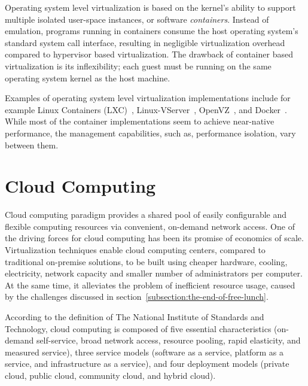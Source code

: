 Operating system level virtualization is based on the kernel's ability to support multiple isolated user-space instances, or software \emph{containers}. Instead of emulation, programs running in containers consume the host operating system's standard system call interface, resulting in negligible virtualization overhead compared to hypervisor based virtualization. The drawback of container based virtualization is its inflexibility; each guest must be running on the same operating system kernel as the host machine.~\cite{Soltesz:2007:COS, Xavier:2014:Containers}

Examples of operating system level virtualization implementations include for example Linux Containers (LXC)~\cite{LinuxContainers:2013:LXC}, Linux-VServer~\cite{Des:2005:Virtualization}, OpenVZ~\cite{OpenVZ:2013}, and Docker~\cite{Merkel:2014:Docker}. While most of the container implementations seem to achieve near-native performance, the management capabilities, such as, performance isolation, vary between them.

\section{Cloud Computing}
Cloud computing paradigm provides a shared pool of easily configurable and flexible computing resources via convenient, on-demand network access. One of the driving forces for cloud computing has been its promise of economics of scale. Virtualization techniques enable cloud computing centers, compared to traditional on-premise solutions, to be built using cheaper hardware, cooling, electricity, network capacity and smaller number of administrators per computer. At the same time, it alleviates the problem of inefficient resource usage, caused by the challenges discussed in section~\ref{subsection:the-end-of-free-lunch}.~\cite{Mell:2011:ccdef}

According to the definition of The National Institute of Standards and Technology, cloud computing is composed of five essential characteristics (on-demand self-service, broad network access, resource pooling, rapid elasticity, and measured service), three service models (software as a service, platform as a service, and infrastructure as a service), and four deployment models (private cloud, public cloud, community cloud, and hybrid cloud).~\cite{Mell:2011:ccdef}

